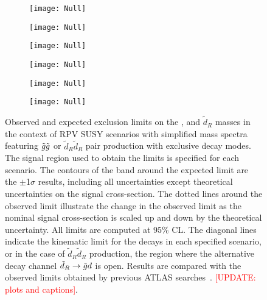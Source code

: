 \begin{figure}[p]
\centering
\begin{subfigure}[t]{0.49\textwidth}\texttt{[image: Null]}\caption{}\label{fig:limits_feynm_rpv_gl313}\end{subfigure}
\begin{subfigure}[t]{0.49\textwidth}\texttt{[image: Null]}\caption{}\label{fig:limits_feynm_rpv_gl321}\end{subfigure}
\begin{subfigure}[t]{0.49\textwidth}\texttt{[image: Null]}\caption{}\label{fig:limits_feynm_rpv_glprime}\end{subfigure}
\begin{subfigure}[t]{0.49\textwidth}\texttt{[image: Null]}\caption{}\label{fig:limits_feynm_rpv_gl112l}\end{subfigure}
\begin{subfigure}[t]{0.49\textwidth}\texttt{[image: Null]}\caption{}\label{fig:limits_feynm_rpv_sd313}\end{subfigure}
\begin{subfigure}[t]{0.49\textwidth}\texttt{[image: Null]}\caption{}\label{fig:limits_feynm_rpv_sd321}\end{subfigure}
\caption{
Observed and expected exclusion limits on the \gluino, \stopone and $\tilde d_R$ masses 
in the context of RPV SUSY scenarios with simplified mass spectra 
featuring $\tilde{g}\tilde{g}$ or $\tilde d_R\tilde d_R$ pair production with exclusive decay modes. 
The signal region used to obtain the limits is specified for each scenario. 
The contours of the band around the expected limit are the $\pm$1$\sigma$ results, 
including all uncertainties except theoretical uncertainties on the signal cross-section. The dotted lines around the observed
limit illustrate the change in the observed limit as the nominal signal cross-section is scaled up and down
by the theoretical uncertainty. All limits are computed at 95\% CL. 
The diagonal lines indicate the kinematic limit for the decays in each specified scenario, 
or in the case of $\tilde d_R\tilde d_R$ production, the region where the alternative decay channel $\tilde d_R\to \tilde{g} d$ is open. 
Results are compared with the observed limits obtained by previous ATLAS searches~\cite{Aad:2015iea}. 
\textcolor{red}{[UPDATE: plots and captions]}.
}
\label{fig:Results_Limits_RPV} 
\end{figure}

